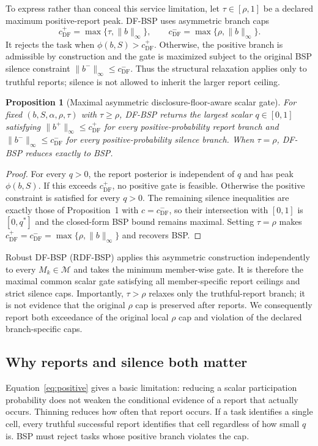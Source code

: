 \documentclass[review,12pt]{elsarticle}
\newtheorem{proposition}{Proposition}
\begin{document}
To express rather than conceal this service limitation, let $\tau\in[\rho,1]$ be a declared maximum positive-report peak. DF-BSP uses asymmetric branch caps
\begin{equation}
 c^+_{\mathrm{DF}}=\max\{\tau,\|b\|_\infty\},
 \qquad
 c^-_{\mathrm{DF}}=\max\{\rho,\|b\|_\infty\}.
 \label{eq:dfcap}
\end{equation}
It rejects the task when $\phi(b,S)>c^+_{\mathrm{DF}}$. Otherwise, the positive branch is admissible by construction and the gate is maximized subject to the original BSP silence constraint $\|b^-\|_\infty\le c^-_{\mathrm{DF}}$. Thus the structural relaxation applies only to truthful reports; silence is not allowed to inherit the larger report ceiling.

\begin{proposition}[Maximal asymmetric disclosure-floor-aware scalar gate]
For fixed $(b,S,\alpha,\rho,\tau)$ with $\tau\ge\rho$, DF-BSP returns the largest scalar $q\in[0,1]$ satisfying $\|b^+\|_\infty\le c^+_{\mathrm{DF}}$ for every positive-probability report branch and $\|b^-\|_\infty\le c^-_{\mathrm{DF}}$ for every positive-probability silence branch. When $\tau=\rho$, DF-BSP reduces exactly to BSP.
\end{proposition}
\begin{proof}
For every $q>0$, the report posterior is independent of $q$ and has peak $\phi(b,S)$. If this exceeds $c^+_{\mathrm{DF}}$, no positive gate is feasible. Otherwise the positive constraint is satisfied for every $q>0$. The remaining silence inequalities are exactly those of Proposition~1 with $c=c^-_{\mathrm{DF}}$, so their intersection with $[0,1]$ is $[0,q^*]$ and the closed-form BSP bound remains maximal. Setting $\tau=\rho$ makes $c^+_{\mathrm{DF}}=c^-_{\mathrm{DF}}=\max\{\rho,\|b\|_\infty\}$ and recovers BSP.
\end{proof}

Robust DF-BSP (RDF-BSP) applies this asymmetric construction independently to every $M_k\in\mathcal M$ and takes the minimum member-wise gate. It is therefore the maximal common scalar gate satisfying all member-specific report ceilings and strict silence caps. Importantly, $\tau>\rho$ relaxes only the truthful-report branch; it is not evidence that the original $\rho$ cap is preserved after reports. We consequently report both exceedance of the original local $\rho$ cap and violation of the declared branch-specific caps.

\subsection{Why reports and silence both matter}
Equation~\eqref{eq:positive} gives a basic limitation: reducing a scalar participation probability does not weaken the conditional evidence of a report that actually occurs. Thinning reduces how often that report occurs. If a task identifies a single cell, every truthful successful report identifies that cell regardless of how small $q$ is. BSP must reject tasks whose positive branch violates the cap.
\end{document}
